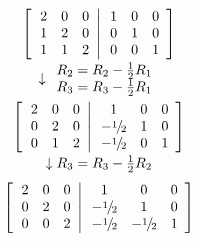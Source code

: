 \documentclass[10pt, twocolumn]{article}
\begin{document}
\[\begin{array}{*{20}{c}}
  {\left[ {\left. {\begin{array}{*{20}{c}}
  2&0&0 \\ 
  1&2&0 \\ 
  1&1&2 
\end{array}} \right|\begin{array}{*{20}{c}}
  1&0&0 \\ 
  0&1&0 \\ 
  0&0&1 
\end{array}} \right]} \\[0.5cm] 
{ \downarrow {\begin{array}{*{20}{c}}
  {{R_2} = {R_2} - \tfrac{1}{2}{R_1}} \\ 
  {{R_3} = {R_3} - \tfrac{1}{2}{R_1}} 
\end{array}}} \\[0.35cm] 
  {\left[ {\left. {\begin{array}{*{20}{c}}
  2&0&0 \\ 
  0&2&0 \\ 
  0&1&2 
\end{array}} \right|\begin{array}{*{20}{c}}
  1&0&0 \\ 
  { - {\raise0.5ex\hbox{$\scriptstyle 1$}
\kern-0.1em/\kern-0.15em
\lower0.25ex\hbox{$\scriptstyle 2$}}}&1&0 \\ 
  { - {\raise0.5ex\hbox{$\scriptstyle 1$}
\kern-0.1em/\kern-0.15em
\lower0.25ex\hbox{$\scriptstyle 2$}}}&0&1 
\end{array}} \right]} \\[0.5cm]
  { \downarrow \tiny{{R_3} = {R_3} - \tfrac{1}{2}{R_2}}} \\[0.25cm]
  {\left[ {\left. {\begin{array}{*{20}{c}}
  2&0&0 \\ 
  0&2&0 \\ 
  0&0&2 
\end{array}} \right|\begin{array}{*{20}{c}}
  1&0&0 \\ 
  { - {\raise0.5ex\hbox{$\scriptstyle 1$}
\kern-0.1em/\kern-0.15em
\lower0.25ex\hbox{$\scriptstyle 2$}}}&1&0 \\ 
  { - {\raise0.5ex\hbox{$\scriptstyle 1$}
\kern-0.1em/\kern-0.15em
\lower0.25ex\hbox{$\scriptstyle 2$}}}&{ - {\raise0.5ex\hbox{$\scriptstyle 1$}
\kern-0.1em/\kern-0.15em
\lower0.25ex\hbox{$\scriptstyle 2$}}}&1 
\end{array}} \right]} \\[0.5cm] 

\end{array}\]
\end{document}
